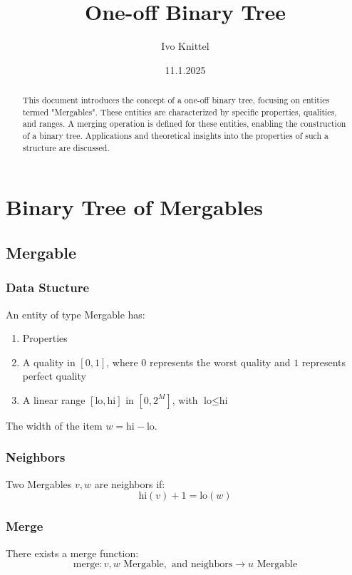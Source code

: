 \documentclass{article}
\title{One-off Binary Tree}
\author{Ivo Knittel}
\date{11.1.2025}
\theoremstyle{plain}
\begin{document}
\maketitle

\begin{abstract}
This document introduces the concept of a one-off binary tree, focusing on entities termed "Mergables". These entities are characterized by specific properties, qualities, and ranges. A merging operation is defined for these entities, enabling the construction of a binary tree. Applications and theoretical insights into the properties of such a structure are discussed.
\end{abstract}

\tableofcontents

\section{Binary Tree of Mergables}

\subsection*{Mergable}
\subsubsection*{Data Stucture}
An entity of type Mergable has:
\begin{enumerate}
    \item Properties 
    \item A quality in $[0,1]$, where $0$ represents the worst quality and $1$ represents perfect quality
    \item A linear range $[\text{lo}, \text{hi}]$ in $[0, 2^M]$, with $\text{lo} \leq \text{hi}$
\end{enumerate}

 The width of the item $w =\text{hi} -  \text{lo}$.

\subsubsection*{Neighbors}

Two Mergables $v, w$ are neighbors if:
\[
\text{hi}(v) + 1 = \text{lo}(w)
\]

\subsubsection*{Merge}
There exists a merge function:
\[
\text{merge}: v, w  \text{  Mergable}, \text{ and neighbors} \rightarrow u  \text{  Mergable}
\]
\end{document}

